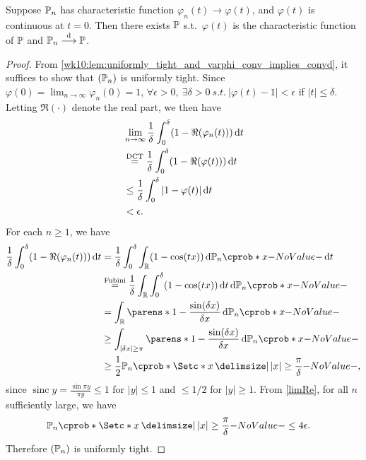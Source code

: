 \documentclass[12pt]{article}
\begin{document}
\begin{Theorem}\label{wk10:thm:Levy's Continuity Theorem}
Suppose $\P_n$ has characteristic function $\varphi_n(t)\to \varphi(t)$, and $\varphi(t)$ is continuous at $t=0$. Then there exists $\P$ s.t.\ $\varphi(t)$ is the characteristic function of $\P$ and $\P_n\convd \P$.
\end{Theorem}
\begin{proof}
From \cref{wk10:lem:uniformly_tight_and_varphi_conv_implies_convd}, it suffices to show that $(\P_n)$ is uniformly tight. Since $\varphi(0) =\lim_{n\to \infty} \varphi_n(0)=1$, $\forall \epsilon >0,\ \exists \delta>0 \ s.t.\ |\varphi(t)-1|<\epsilon$ if $|t|\leq\delta$. Letting $\Re(\cdot)$ denote the real part, we then have
\begin{align}
& \lim_{n\to \infty} \frac{1}{\delta} \int _{0}^{\delta} (1-\Re(\varphi_n(t))) \,\mathrm{d} t\nonumber\\ 
& \overset{\text{DCT}}{=} \frac{1}{\delta} \int _{0}^{\delta} (1-\Re(\varphi(t))) \,\mathrm{d} t\nonumber\\ 
& \leq \frac{1}{\delta} \int _{0}^{\delta} |1-\varphi(t)| \,\mathrm{d} t\nonumber\\ 
& <\epsilon.\label{limRe}
\end{align}
For each $n\geq1$, we have
\begin{align*}
\frac{1}{\delta} \int _{0}^{\delta} (1-\Re (\varphi_n(t))) \ud t 	
&=\frac{1}{\delta} \int _{0}^{\delta} \int_{\Real} (1-\cos(tx)) \ud \P_n(x) \ud t\\
&\overset{\text{Fubini}}{=}  \frac{1}{\delta}  \int_{\Real} \int _{0}^{\delta} (1-\cos(tx)) \ud t \ud \P_n(x) \\
& = \int _{\Real}\parens*{1-\frac{\sin (\delta x)}{\delta x}} \ud \P_n(x)\\
& \geq \int_{|\delta x|\geq \pi}\parens*{1-\frac{\sin (\delta x)}{\delta x}} \ud \P_n(x)\\
& \geq \frac{1}{2} \P_n(\set*{x\given |x| \geq \frac{\pi}{\delta}}),
\end{align*}
since $\operatorname{sinc} y = \frac{\sin \pi y}{\pi y} \leq 1$ for $|y| \leq 1$ and $\leq 1/2$ for $|y| \geq 1$. From \cref{limRe}, for all $n$ sufficiently large, we have
\begin{align*}
& \P_n(\set*{x\given |x| \geq \frac{\pi}{\delta}}) \leq 4 \epsilon.
\end{align*}
Therefore $(\P_n)$ is uniformly tight.
\end{proof}
\end{document}
